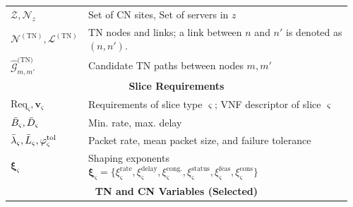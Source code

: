 \documentclass[12pt,lettersize,journal,onecolumn]{IEEEtran}
\begin{document}
\begin{table}[htbp]
\begin{tabular}{@{}p{0.192\linewidth}p{0.77\linewidth}@{}}
    $\mathcal{Z},\mathcal{N}_z$ & Set of CN sites, Set of servers in $z$ \\
    $\mathcal{N}^{(\text{TN})},\mathcal{L}^{(\text{TN})}$ & TN nodes and links; a link between $n$ and $n'$ is denoted as $(n,n')$. \\
    $\widehat{\mathcal{G}}^{\text{(TN)}}_{m,m'}$ & Candidate TN paths between nodes $m,m'$ \\
    \midrule
    \multicolumn{2}{c}{\textbf{Slice Requirements}} \\
    \midrule
    $\mathrm{Req}_{\varsigma}, \boldsymbol{v}_{\varsigma}$ & Requirements of slice type $\varsigma$; VNF descriptor of slice $\varsigma$ \\
    $\Bar{B}_{\varsigma},\Bar{D}_{\varsigma}$ & Min. rate, max. delay \\
    $\Bar{\lambda}_{\varsigma},\Bar{L}_{\varsigma}, \varphi^{\mathrm{tol}}_{\varsigma}$ & Packet rate, mean packet size, and failure tolerance \\
    $\boldsymbol{\xi}_{\varsigma}$ & Shaping exponents $\boldsymbol{\xi}_{\varsigma}=\{\xi^{\mathrm{rate}}_{\varsigma}, \xi^{\mathrm{delay}}_{\varsigma}, \xi^{\mathrm{cong.}}_{\varsigma}, \xi^{\mathrm{status}}_{\varsigma}, \xi^{\mathrm{feas}}_{\varsigma}, \xi^{\mathrm{cons}}_{\varsigma}\}$ \\
    \midrule
    \multicolumn{2}{c}{\textbf{TN and CN Variables (Selected)}} \\
    \midrule

\end{tabular}
\end{table}
\end{document}
